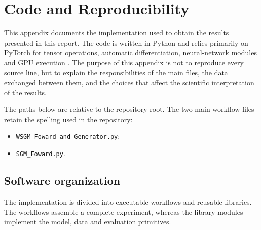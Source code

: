 \chapter{Code and Reproducibility}
\label{chap:code_appendix}

This appendix documents the implementation used to obtain the results presented
in this report. The code is written in Python and relies primarily on PyTorch
for tensor operations, automatic differentiation, neural-network modules and
GPU execution \citep{paszke2019pytorch}. The purpose of this appendix is not to
reproduce every source line, but to explain the responsibilities of the main
files, the data exchanged between them, and the choices that affect the
scientific interpretation of the results.

The paths below are relative to the repository root. The two main workflow
files retain the spelling used in the repository:
\begin{itemize}
\item \lstinline|WSGM_Foward_and_Generator.py|;
\item \lstinline|SGM_Foward.py|.
\end{itemize}

\section{Software organization}

The implementation is divided into executable workflows and reusable
libraries. The workflows assemble a complete experiment, whereas the library
modules implement the model, data and evaluation primitives.

